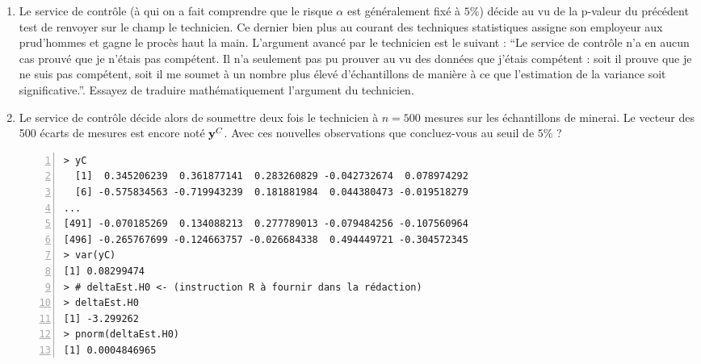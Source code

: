 \documentclass[10pt]{report}
\begin{document}
\begin{exercice}
\begin{enumerate}
\item Le service de contr{\^o}le ({\`a} qui on a fait comprendre que le risque $\alpha$ est g{\'e}n{\'e}ralement fix{\'e} {\`a} $5\%$) d{\'e}cide au vu de la p-valeur du pr{\'e}c{\'e}dent test de renvoyer sur le champ le technicien. Ce dernier bien plus au courant des techniques statistiques assigne son employeur aux prud'hommes et gagne le proc{\`e}s haut la main. L'argument avanc{\'e} par le technicien est le suivant : ``Le service de contr{\^o}le n'a en aucun cas prouv{\'e} que je n'{\'e}tais pas comp{\'e}tent. Il n'a seulement pas pu prouver au vu des donn{\'e}es que j'{\'e}tais comp{\'e}tent : soit il prouve que je ne suis pas comp{\'e}tent, soit il me soumet {\`a} un nombre plus {\'e}lev{\'e} d'{\'e}chantillons de mani{\`e}re {\`a} ce que l'estimation de la variance soit significative.''. Essayez de traduire math{\'e}matiquement l'argument du technicien. 



\item Le service de contr{\^o}le d{\'e}cide alors de soumettre deux fois le technicien {\`a} $n=500$ mesures sur les {\'e}chantillons de minerai. Le vecteur des 500 {\'e}carts de mesures est encore not{\'e} ${\bf y}^C$. Avec ces nouvelles observations que concluez-vous au seuil de $5 \%$ ? \\

\IndicR
\begin{Verbatim}[frame=leftline,fontfamily=tt,fontshape=n,numbers=left]
> yC
  [1]  0.345206239  0.361877141  0.283260829 -0.042732674  0.078974292
  [6] -0.575834563 -0.719943239  0.181881984  0.044380473 -0.019518279
...
[491] -0.070185269  0.134088213  0.277789013 -0.079484256 -0.107560964
[496] -0.265767699 -0.124663757 -0.026684338  0.494449721 -0.304572345
> var(yC)
[1] 0.08299474
> # deltaEst.H0 <- (instruction R à fournir dans la rédaction)
> deltaEst.H0
[1] -3.299262
> pnorm(deltaEst.H0)
[1] 0.0004846965
\end{Verbatim}

 

\end{enumerate}
\end{exercice}
\end{document}
